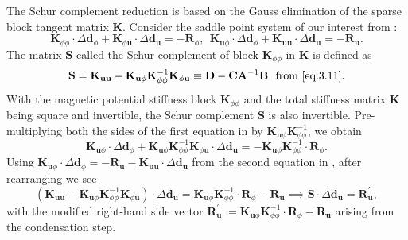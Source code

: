 The Schur complement reduction is based on the Gauss elimination of the sparse block tangent matrix $\mathbf{K}$. Consider the saddle point system of our interest from :
\begin{equation}
\mathbf{K}_{\phi \phi} \cdot \Delta \mathbf{d}_{\phi} + \mathbf{K}_{\phi \mathbf{u}} \cdot \Delta \mathbf{d}_{\mathbf{u}} = -\mathbf{R}_{\phi}, \ \ \mathbf{K}_{\mathbf{u} \phi} \cdot \Delta \mathbf{d}_{\phi} + \mathbf{K}_{\mathbf{u} \mathbf{u}} \cdot \Delta \mathbf{d}_{\mathbf{u}} = -\mathbf{R}_{\mathbf{u}}. 
\label{eq:3.16}
\end{equation}
The matrix $\mathbf{S}$ called the Schur complement of block $\mathbf{K}_{\phi \phi}$ in $\mathbf{K}$ is defined as
\begin{equation}
\mathbf{S} = \mathbf{K}_{\mathbf{u} \mathbf{u}} - \mathbf{K}_{\mathbf{u} \phi} \mathbf{K}_{\phi \phi}^{-1} \mathbf{K}_{\phi \mathbf{u}} \equiv \mathbf{D} - \mathbf{C} \mathbf{A}^{-1} \mathbf{B} \ \ \text{from \Cref{eq:3.11}}.
\label{eq:3.18}
\end{equation}
With the magnetic potential stiffness block $\mathbf{K}_{\phi \phi}$ and the total stiffness matrix $\mathbf{K}$ being square and invertible, the Schur complement $\mathbf{S}$ is also invertible. Pre-multiplying both the sides of the first equation in  by $\mathbf{K}_{\mathbf{u} \phi} \mathbf{K}_{\phi \phi}^{-1}$, we obtain
\begin{equation}
\mathbf{K}_{\mathbf{u} \phi} \cdot \Delta \mathbf{d}_{\phi} +  \mathbf{K}_{\mathbf{u} \phi} \mathbf{K}_{\phi \phi}^{-1} \mathbf{K}_{\phi \mathbf{u}} \cdot \Delta \mathbf{d}_{\mathbf{u}} = -\mathbf{K}_{\mathbf{u} \phi} \mathbf{K}_{\phi \phi}^{-1} \cdot \mathbf{R}_{\phi}.
\end{equation}
Using $\mathbf{K}_{\mathbf{u} \phi} \cdot \Delta \mathbf{d}_{\phi} = -\mathbf{R}_{\mathbf{u}} - \mathbf{K}_{\mathbf{u} \mathbf{u}} \cdot \Delta \mathbf{d}_{\mathbf{u}}$ from the second equation in , after rearranging we see
\begin{equation}
\left( \mathbf{K}_{\mathbf{u} \mathbf{u}} - \mathbf{K}_{\mathbf{u} \phi} \mathbf{K}_{\phi \phi}^{-1} \mathbf{K}_{\phi \mathbf{u}} \right) \cdot \Delta \mathbf{d}_{\mathbf{u}} = \mathbf{K}_{\mathbf{u} \phi} \mathbf{K}_{\phi \phi}^{-1} \cdot \mathbf{R}_{\phi} - \mathbf{R}_{\mathbf{u}} \implies \mathbf{S} \cdot \Delta \mathbf{d}_{\mathbf{u}} = \mathbf{R}_{\mathbf{u}}^',
\label{eq:3.19}
\end{equation}
with the modified right-hand side vector $\mathbf{R}_{\mathbf{u}}^' := \mathbf{K}_{\mathbf{u} \phi} \mathbf{K}_{\phi \phi}^{-1} \cdot \mathbf{R}_{\phi} - \mathbf{R}_{\mathbf{u}}$ arising from the condensation step.
